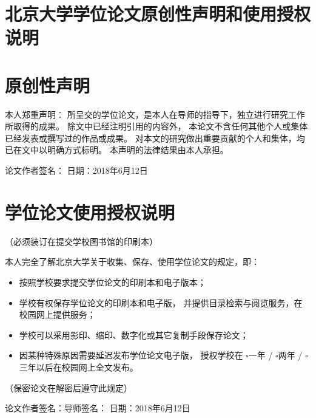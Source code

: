 \cleardoublepage\pagestyle{empty}
{
	\linespread{1.5}\selectfont
	\section*{北京大学学位论文原创性声明和使用授权说明}

	\vfill
	\section*{原创性声明}

	本人郑重声明：
	所呈交的学位论文，是本人在导师的指导下，独立进行研究工作所取得的成果。
	除文中已经注明引用的内容外，
	本论文不含任何其他个人或集体已经发表或撰写过的作品或成果。
	对本文的研究做出重要贡献的个人和集体，均已在文中以明确方式标明。
	本声明的法律结果由本人承担。
	\vspace{2.5em}\par
	\rightline
	{%
		论文作者签名：\hspace{5em}%
		日期：\hspace{2em}2018年\hspace{2em}6月\hspace{2em}12日%
	}

	\vfill
	\section*{学位论文使用授权说明}
	\vspace{-1em}\par
	\centerline{（必须装订在提交学校图书馆的印刷本）}
	\vspace{1em}\par

	本人完全了解北京大学关于收集、保存、使用学位论文的规定，即：
	\begin{itemize}
		\item 按照学校要求提交学位论文的印刷本和电子版本；
		\item 学校有权保存学位论文的印刷本和电子版，
			并提供目录检索与阅览服务，在校园网上提供服务；
		\item 学校可以采用影印、缩印、数字化或其它复制手段保存论文；
		\item 因某种特殊原因需要延迟发布学位论文电子版，
			授权学校在 $\square$\nobreakspace{}一年 / %
			$\square$\nobreakspace{}两年 / %
			$\square$\nobreakspace{}三年以后在校园网上全文发布。
	\end{itemize}
	\par（保密论文在解密后遵守此规定）
	\vspace{2.5em}\par
	\rightline
	{%
		论文作者签名：\hspace{5em}导师签名：\hspace{5em}%
		日期：\hspace{2em}2018年\hspace{2em}6月\hspace{2em}12日%
	}
	\par
}

